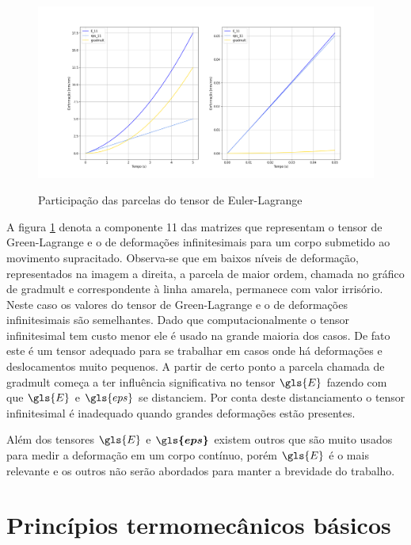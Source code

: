 \begin{figure}[H]
\caption{Participação das parcelas do tensor de Euler-Lagrange}
\centering
	\includegraphics[width = \textwidth]{images/quest3ex.png}
	\label{fig:gradmult}
\end{figure}

A figura \ref{fig:gradmult} denota a componente 11 das matrizes que representam o tensor de Green-Lagrange e o de deformações infinitesimais para um corpo submetido ao movimento supracitado. Observa-se que em baixos níveis de deformação, representados na imagem a direita, a parcela de maior ordem, chamada no gráfico de gradmult e correspondente à linha amarela, permanece com valor irrisório. Neste caso os valores do tensor de Green-Lagrange e o de deformações infinitesimais são semelhantes. Dado que computacionalmente o tensor infinitesimal tem custo menor ele é usado na grande maioria dos casos. De fato este é um tensor adequado para se trabalhar em casos onde há deformações e deslocamentos muito pequenos. A partir de certo ponto a parcela chamada de gradmult começa a ter influência significativa no tensor $ \gls{E} $ fazendo com que $ \gls{E} $ e $ \gls{eps} $ se distanciem. Por conta deste distanciamento o tensor infinitesimal é inadequado quando grandes deformações estão presentes. \par

Além dos tensores $ \gls{E} $ e $ \boldsymbol{\gls{eps}} $ existem outros que são muito usados para medir a deformação em um corpo contínuo, porém $\gls{E}$ é o mais relevante e os outros não serão abordados para manter a brevidade do trabalho.

\section{Princípios termomecânicos básicos}

